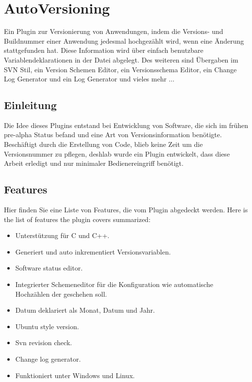\section{AutoVersioning}\label{sec:autoversioning}

Ein Plugin zur Versionierung von Anwendungen, indem die Versions- und Buildnummer einer Anwendung jedesmal hochgezählt wird, wenn eine Änderung stattgefunden hat. Diese Information wird über einfach benutzbare Variablendeklarationen in der Datei  abgelegt. Des weiteren sind Übergaben im SVN Stil, ein Version Schemen Editor, ein Versionsschema Editor, ein Change Log Generator und ein Log Generator und vieles mehr $\ldots$

\subsection{Einleitung}

Die Idee dieses Plugins entstand bei Entwicklung von Software, die sich im frühen pre-alpha Status befand und eine Art von Versionsinformation benötigte. Beschäftigt durch die Erstellung von Code, blieb keine Zeit um die Versionsnummer zu pflegen, deshlab wurde ein Plugin entwickelt, dass diese Arbeit erledigt und nur minimaler Bedienereingriff benötigt.

\subsection{Features}

Hier finden Sie eine Liste von Features, die vom Plugin abgedeckt werden.
Here is the list of features the plugin covers summarized:

\begin{itemize}
\item Unterstützung für C und C++.
\item Generiert und auto inkrementiert Versionsvariablen.
\item Software status editor.
\item Integrierter Schemeneditor für die Konfiguration wie automatische Hochzählen der  geschehen soll.
\item Datum deklariert als Monat, Datum und Jahr.
\item Ubuntu style version.
\item Svn revision check.
\item Change log generator.
\item Funktioniert unter Windows und Linux.
\end{itemize}

